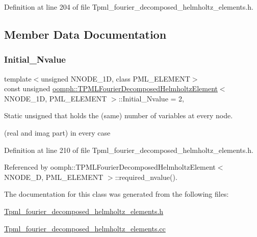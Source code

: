 Definition at line 204 of file Tpml\+\_\+fourier\+\_\+decomposed\+\_\+helmholtz\+\_\+elements.\+h.



\subsection{Member Data Documentation}
\mbox{\label{classoomph_1_1TPMLFourierDecomposedHelmholtzElement_a165a94b1ce95d9ade20eb1af64114087}} 
\subsubsection{\texorpdfstring{Initial\+\_\+\+Nvalue}{Initial\_Nvalue}}
{\footnotesize\ttfamily template$<$unsigned N\+N\+O\+D\+E\+\_\+1D, class P\+M\+L\+\_\+\+E\+L\+E\+M\+E\+NT$>$ \\
const unsigned \hyperlink{classoomph_1_1TPMLFourierDecomposedHelmholtzElement}{oomph\+::\+T\+P\+M\+L\+Fourier\+Decomposed\+Helmholtz\+Element}$<$ N\+N\+O\+D\+E\+\_\+1D, P\+M\+L\+\_\+\+E\+L\+E\+M\+E\+NT $>$\+::Initial\+\_\+\+Nvalue = 2\hspace{0.3cm}{\ttfamily [static]}, {\ttfamily [private]}}



Static unsigned that holds the (same) number of variables at every node. 

(real and imag part) in every case 

Definition at line 210 of file Tpml\+\_\+fourier\+\_\+decomposed\+\_\+helmholtz\+\_\+elements.\+h.



Referenced by oomph\+::\+T\+P\+M\+L\+Fourier\+Decomposed\+Helmholtz\+Element$<$ N\+N\+O\+D\+E\+\_\+D, P\+M\+L\+\_\+\+E\+L\+E\+M\+E\+N\+T $>$\+::required\+\_\+nvalue().



The documentation for this class was generated from the following files\+:\begin{DoxyCompactItemize}
\item 
\hyperlink{Tpml__fourier__decomposed__helmholtz__elements_8h}{Tpml\+\_\+fourier\+\_\+decomposed\+\_\+helmholtz\+\_\+elements.\+h}\item 
\hyperlink{Tpml__fourier__decomposed__helmholtz__elements_8cc}{Tpml\+\_\+fourier\+\_\+decomposed\+\_\+helmholtz\+\_\+elements.\+cc}\end{DoxyCompactItemize}
